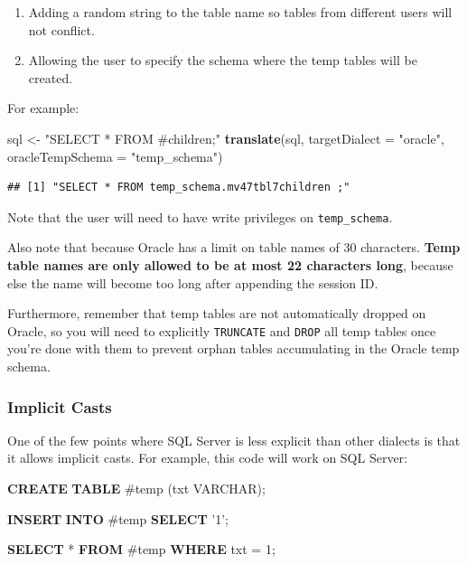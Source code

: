 \documentclass[11pt]{book}
\newenvironment{Shaded}{\begin{snugshade}}{\end{snugshade}}
\newcommand{\KeywordTok}[1]{\textcolor[rgb]{0.13,0.29,0.53}{\textbf{#1}}}
\newcommand{\DataTypeTok}[1]{\textcolor[rgb]{0.13,0.29,0.53}{#1}}
\newcommand{\DecValTok}[1]{\textcolor[rgb]{0.00,0.00,0.81}{#1}}
\newcommand{\StringTok}[1]{\textcolor[rgb]{0.31,0.60,0.02}{#1}}
\newcommand{\NormalTok}[1]{#1}
\providecommand{\tightlist}{%
  \setlength{\itemsep}{0pt}\setlength{\parskip}{0pt}}
\theoremstyle{definition}
\theoremstyle{definition}
\theoremstyle{definition}
\theoremstyle{remark}
\begin{document}
\begin{enumerate}
\def\labelenumi{\arabic{enumi}.}
\tightlist
\item
  Adding a random string to the table name so tables from different
  users will not conflict.
\item
  Allowing the user to specify the schema where the temp tables will be
  created.
\end{enumerate}

For example:

\begin{Shaded}
\begin{Highlighting}[]
\NormalTok{sql <-}\StringTok{ "SELECT * FROM #children;"}
\KeywordTok{translate}\NormalTok{(sql, }\DataTypeTok{targetDialect =} \StringTok{"oracle"}\NormalTok{, }\DataTypeTok{oracleTempSchema =} \StringTok{"temp_schema"}\NormalTok{)}
\end{Highlighting}
\end{Shaded}

\begin{verbatim}
## [1] "SELECT * FROM temp_schema.mv47tbl7children ;"
\end{verbatim}

Note that the user will need to have write privileges on
\texttt{temp\_schema}.

Also note that because Oracle has a limit on table names of 30
characters. \textbf{Temp table names are only allowed to be at most 22
characters long}, because else the name will become too long after
appending the session ID.

Furthermore, remember that temp tables are not automatically dropped on
Oracle, so you will need to explicitly \texttt{TRUNCATE} and
\texttt{DROP} all temp tables once you're done with them to prevent
orphan tables accumulating in the Oracle temp schema.

\subsubsection*{Implicit Casts}\label{implicit-casts}

One of the few points where SQL Server is less explicit than other
dialects is that it allows implicit casts. For example, this code will
work on SQL Server:

\begin{Shaded}
\begin{Highlighting}[]
\KeywordTok{CREATE} \KeywordTok{TABLE}\NormalTok{ #temp (txt }\DataTypeTok{VARCHAR}\NormalTok{);}

\KeywordTok{INSERT} \KeywordTok{INTO}\NormalTok{ #temp}
\KeywordTok{SELECT} \StringTok{'1'}\NormalTok{;}

\KeywordTok{SELECT}\NormalTok{ * }\KeywordTok{FROM}\NormalTok{ #temp }\KeywordTok{WHERE}\NormalTok{ txt = }\DecValTok{1}\NormalTok{;}
\end{Highlighting}
\end{Shaded}
\end{document}
